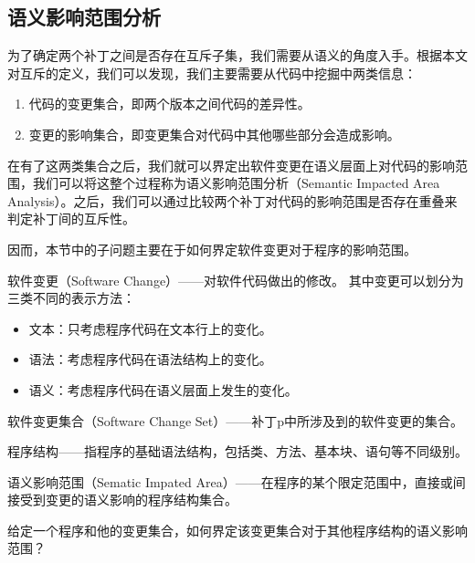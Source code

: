 \subsection{语义影响范围分析}
\label {sia}

为了确定两个补丁之间是否存在互斥子集，我们需要从语义的角度入手。根据本文对互斥的定义，我们可以发现，我们主要需要从代码中挖掘中两类信息：
\begin{enumerate}
	\item 代码的变更集合，即两个版本之间代码的差异性。
	\item 变更的影响集合，即变更集合对代码中其他哪些部分会造成影响。
\end{enumerate}

在有了这两类集合之后，我们就可以界定出软件变更在语义层面上对代码的影响范围，我们可以将这整个过程称为语义影响范围分析（Semantic Impacted Area Analysis）。之后，我们可以通过比较两个补丁对代码的影响范围是否存在重叠来判定补丁间的互斥性。

因而，本节中的子问题主要在于如何界定软件变更对于程序的影响范围。


\begin{definition}
	软件变更（Software Change）——对软件代码做出的修改。
	其中变更可以划分为三类不同的表示方法：
		\begin{itemize}
			\item 文本：只考虑程序代码在文本行上的变化。
			\item 语法：考虑程序代码在语法结构上的变化。
			\item 语义：考虑程序代码在语义层面上发生的变化。
		\end{itemize}
\end{definition}

\begin{definition}
	软件变更集合（Software Change Set）——补丁p中所涉及到的软件变更的集合。
\end{definition}

\begin{definition}
	程序结构——指程序的基础语法结构，包括类、方法、基本块、语句等不同级别。
\end{definition}

\begin{definition}
	语义影响范围（Sematic Impated Area）——在程序的某个限定范围中，直接或间接受到变更的语义影响的程序结构集合。
\end{definition}

\begin{problem}
	\label {impacted_area}
	给定一个程序和他的变更集合，如何界定该变更集合对于其他程序结构的语义影响范围？
\end{problem}

